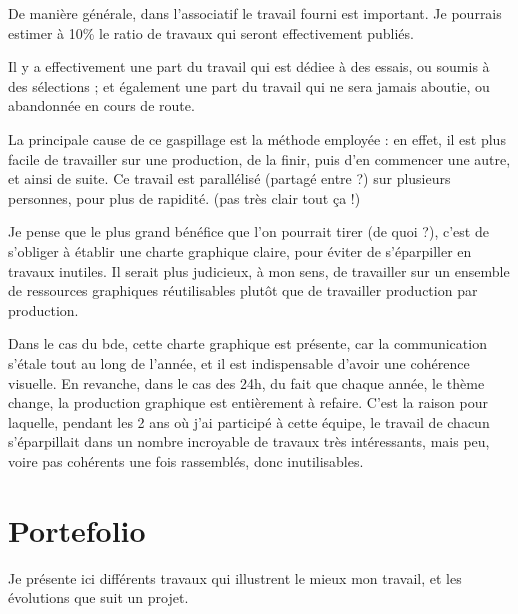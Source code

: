     De manière générale, dans l'associatif le travail fourni est important. Je pourrais estimer à 10\% le ratio de travaux qui seront effectivement publiés.

    Il y a effectivement une part du travail qui est dédiee à des essais, ou soumis à des sélections ; et également une part du travail qui ne sera jamais aboutie, ou abandonnée en cours de route.

    La principale cause de ce gaspillage est la méthode employée : en effet, il est plus facile de travailler sur une production, de la finir, puis d'en commencer une autre, et ainsi de suite. Ce travail est parallélisé (partagé entre ?) sur plusieurs personnes, pour plus de rapidité.
(pas très clair tout ça !)

    Je pense que le plus grand bénéfice que l'on pourrait tirer (de quoi ?), c'est de s'obliger à établir une charte graphique claire, pour éviter de s'éparpiller en travaux inutiles.
    Il serait plus judicieux, à mon sens, de travailler sur un ensemble de ressources graphiques réutilisables plutôt que de travailler production par production.

    Dans le cas du bde, cette charte graphique est présente, car la communication s'étale tout au long de l'année, et il est indispensable d'avoir une cohérence visuelle.
    En revanche, dans le cas des 24h, du fait que chaque année, le thème change, la production graphique est entièrement à refaire.
    C'est la raison pour laquelle, pendant les 2 ans où j'ai participé à cette équipe, le travail de chacun s'éparpillait dans un nombre incroyable de travaux très intéressants, mais peu, voire pas cohérents une fois rassemblés, donc inutilisables.

\newpage

\section{Portefolio}

    Je présente ici différents travaux qui illustrent le mieux mon travail, et les évolutions que suit un projet.
